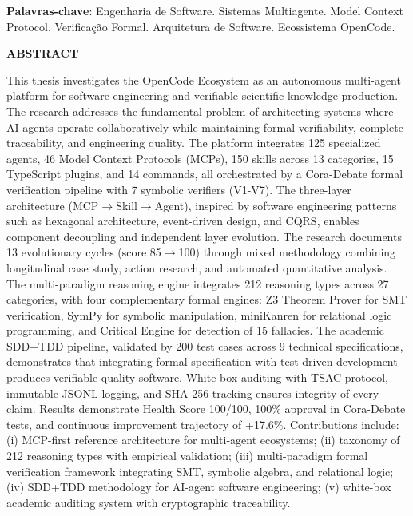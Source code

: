 \documentclass[12pt,a4paper,sumario=tradicional]{abntex2}
\begin{document}
\vspace{0.5cm}
\textbf{Palavras-chave}: Engenharia de Software. Sistemas Multiagente. Model Context Protocol. Verificação Formal. Arquitetura de Software. Ecossistema OpenCode.

\newpage
\begin{center}
\textbf{ABSTRACT}
\end{center}

This thesis investigates the OpenCode Ecosystem as an autonomous multi-agent platform for software engineering and verifiable scientific knowledge production. The research addresses the fundamental problem of architecting systems where AI agents operate collaboratively while maintaining formal verifiability, complete traceability, and engineering quality. The platform integrates 125 specialized agents, 46 Model Context Protocols (MCPs), 150 skills across 13 categories, 15 TypeScript plugins, and 14 commands, all orchestrated by a Cora-Debate formal verification pipeline with 7 symbolic verifiers (V1-V7). The three-layer architecture (MCP$\rightarrow$Skill$\rightarrow$Agent), inspired by software engineering patterns such as hexagonal architecture, event-driven design, and CQRS, enables component decoupling and independent layer evolution. The research documents 13 evolutionary cycles (score 85$\rightarrow$100) through mixed methodology combining longitudinal case study, action research, and automated quantitative analysis. The multi-paradigm reasoning engine integrates 212 reasoning types across 27 categories, with four complementary formal engines: Z3 Theorem Prover for SMT verification, SymPy for symbolic manipulation, miniKanren for relational logic programming, and Critical Engine for detection of 15 fallacies. The academic SDD+TDD pipeline, validated by 200 test cases across 9 technical specifications, demonstrates that integrating formal specification with test-driven development produces verifiable quality software. White-box auditing with TSAC protocol, immutable JSONL logging, and SHA-256 tracking ensures integrity of every claim. Results demonstrate Health Score 100/100, 100\% approval in Cora-Debate tests, and continuous improvement trajectory of +17.6\%. Contributions include: (i) MCP-first reference architecture for multi-agent ecosystems; (ii) taxonomy of 212 reasoning types with empirical validation; (iii) multi-paradigm formal verification framework integrating SMT, symbolic algebra, and relational logic; (iv) SDD+TDD methodology for AI-agent software engineering; (v) white-box academic auditing system with cryptographic traceability.
\end{document}
